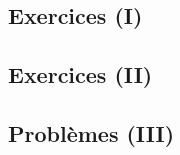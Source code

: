 \documentclass[
  12pt,
]{book}
\begin{document}
\hypertarget{exercices-i-32}{%
\subsection{Exercices (I)}\label{exercices-i-32}}

\hypertarget{exercices-ii-32}{%
\subsection{Exercices (II)}\label{exercices-ii-32}}

\hypertarget{probluxe8mes-iii-32}{%
\subsection{Problèmes (III)}\label{probluxe8mes-iii-32}}

  
\end{document}

